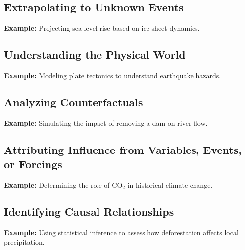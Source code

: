 \documentclass{article}
\begin{document}
\subsection{Extrapolating to Unknown Events}
\textbf{Example:} Projecting sea level rise based on ice sheet dynamics.

\subsection{Understanding the Physical World}
\textbf{Example:} Modeling plate tectonics to understand earthquake hazards.

\subsection{Analyzing Counterfactuals}
\textbf{Example:} Simulating the impact of removing a dam on river flow.

\subsection{Attributing Influence from Variables, Events, or Forcings}
\textbf{Example:} Determining the role of CO$_2$ in historical climate change.

\subsection{Identifying Causal Relationships}
\textbf{Example:} Using statistical inference to assess how deforestation affects local precipitation.
\end{document}
